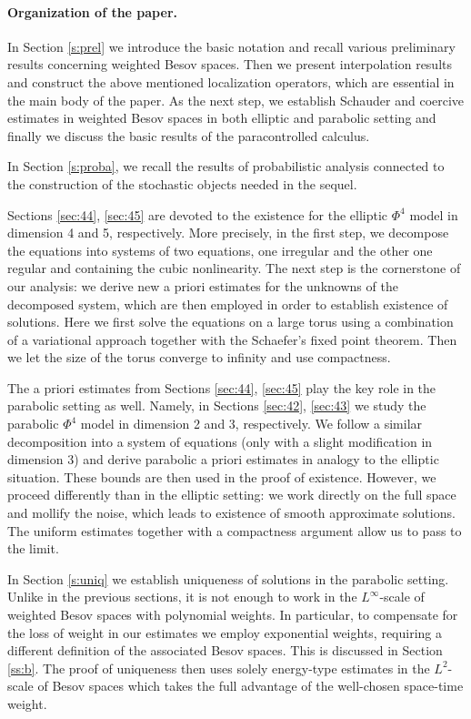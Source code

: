 \documentclass[a4paper,11pt]{article}
\numberwithin{equation}{section}
\newcommand{\8}{\infty}
\begin{document}
\paragraph{Organization of the paper.} In Section \ref{s:prel} we introduce the basic notation and recall  various preliminary results concerning weighted Besov spaces. Then we present interpolation results  and construct the above mentioned localization operators, which are essential in the main body of the paper. As the next step, we establish Schauder and coercive estimates in weighted Besov spaces in both elliptic and parabolic setting and finally we discuss the basic results of the paracontrolled calculus.

In Section \ref{s:proba}, we recall the results of probabilistic analysis connected to the construction of the  stochastic objects needed in the sequel.

Sections \ref{sec:44}, \ref{sec:45} are devoted to the existence for the elliptic $\Phi^{4}$ model in dimension 4 and 5, respectively. More precisely, in the first step, we decompose the equations into  systems of two equations, one irregular  and the other one regular and containing the cubic nonlinearity. The next step is the cornerstone of our  analysis: we derive new a priori estimates for the unknowns of the decomposed system, which are then employed in order to establish existence of solutions. Here we first solve the equations on a large torus using a combination of a variational approach together with the Schaefer's fixed point theorem. Then we let the size of the torus converge to infinity and use compactness.

The a priori estimates from Sections \ref{sec:44}, \ref{sec:45} play the key role in the parabolic setting as well. Namely, in Sections \ref{sec:42}, \ref{sec:43} we study the parabolic $\Phi^{4}$ model in dimension 2 and 3, respectively. We follow a similar decomposition into a system of equations (only with a slight modification in dimension 3) and derive parabolic a priori estimates in analogy to the elliptic situation. These bounds are then used in the proof of existence. However, we proceed differently than in the elliptic setting: we work directly on the full space and mollify the noise, which leads to existence of smooth approximate solutions. The uniform estimates together with a compactness argument allow us to pass to the limit.



In Section \ref{s:uniq} we establish uniqueness of solutions in the parabolic setting. Unlike in the previous sections, it is not enough to work in the $L^{\infty}$-scale of weighted Besov spaces with polynomial weights. In particular, to compensate for the loss of weight in our estimates we employ exponential weights, requiring a different definition of the associated Besov spaces. This is discussed in Section \ref{ss:b}. The  proof of uniqueness then uses solely energy-type estimates in the $L^{2}$-scale of Besov spaces which  takes the full advantage of the well-chosen space-time weight.
\end{document}
